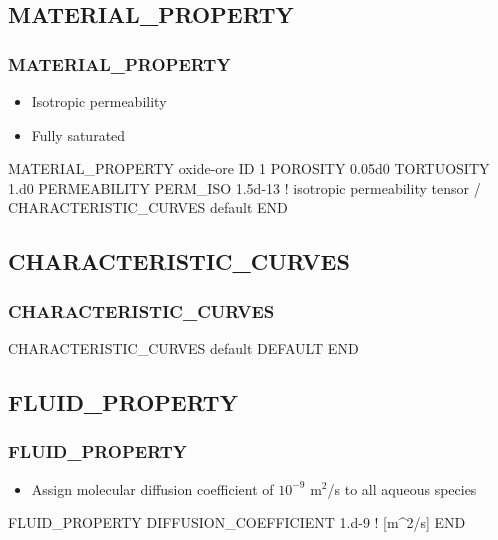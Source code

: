 \documentclass{beamer}
\newcommand\bluecomment[1]{{{\color{blue} #1}}}
\begin{document}
\subsection{MATERIAL\_PROPERTY}

\begin{frame}\frametitle{\bf MATERIAL\_PROPERTY}

\begin{itemize}
  \item Isotropic permeability
  \item Fully saturated
\end{itemize}

\begin{semiverbatim}
MATERIAL_PROPERTY oxide-ore
  ID 1
  POROSITY 0.05d0
  TORTUOSITY 1.d0
  PERMEABILITY
    PERM_ISO 1.5d-13 \bluecomment{! isotropic permeability tensor}
  /
  CHARACTERISTIC_CURVES default
END
\end{semiverbatim}

\end{frame}

\subsection{CHARACTERISTIC\_CURVES}

\begin{frame}[fragile]\frametitle{\bf CHARACTERISTIC\_CURVES}

\begin{semiverbatim}
CHARACTERISTIC_CURVES default
  DEFAULT
END
\end{semiverbatim}

\end{frame}

\subsection{\bf FLUID\_PROPERTY}

\begin{frame}\frametitle{\bf FLUID\_PROPERTY}

\begin{itemize}
  \item Assign molecular diffusion coefficient of $10^{-9}$ m$^2$/s to all aqueous species
\end{itemize}

\begin{semiverbatim}

FLUID_PROPERTY
  DIFFUSION_COEFFICIENT 1.d-9   \bluecomment{! [m^2/s]}
END
\end{semiverbatim}

\end{frame}
\end{document}
